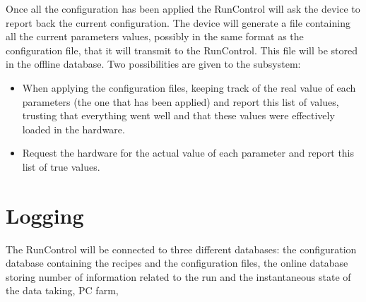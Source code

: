 \documentclass[a4paper]{article}
\begin{document}
Once all the configuration has been applied the RunControl will ask the device to report back the
current configuration. The device will generate a file containing all the current parameters values,
possibly in the same format as the configuration file, that it will transmit to the RunControl. This
file will be stored in the offline database. Two possibilities are given to the subsystem:
\begin{itemize}
  \item When applying the configuration files, keeping track of the real value of each parameters
  (the one that has been applied) and report this list of values, trusting that everything went well
  and that these values were effectively loaded in the hardware.
  \item Request the hardware for the actual value of each parameter and report this list of true
  values.
\end{itemize}


\section{Logging}
The RunControl will be connected to three different databases: the configuration database containing
the recipes and the configuration files, the online database storing number of information related
to the run and the instantaneous state of the data taking, PC farm, 
\end{document}
